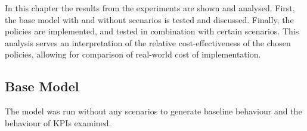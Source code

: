 In this chapter the results from the experiments are shown and analysed. First, the base model with and without scenarios is tested and discussed. Finally, the policies are implemented, and tested in combination with certain scenarios. This analysis serves an interpretation of the relative cost-effectiveness of the chosen policies, allowing for comparison of real-world cost of implementation. 



\subsection{Base Model}
\label{s:baserun}

The model was run without any scenarios to generate baseline behaviour and the behaviour of KPIs examined.

